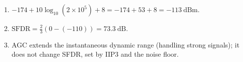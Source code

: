\begin{enumerate}[leftmargin=1.6em,itemsep=2pt]
\item $-174 + 10\log_{10}(2\times10^5) + 8 = -174 + 53 + 8 = -113\ \text{dBm}$.
\item $\text{SFDR} = \tfrac{2}{3}(0 - (-110)) = 73.3\ \text{dB}$.
\item AGC extends the instantaneous dynamic range (handling strong signals); it does not change SFDR, set by IIP3 and the noise floor.
\end{enumerate}
